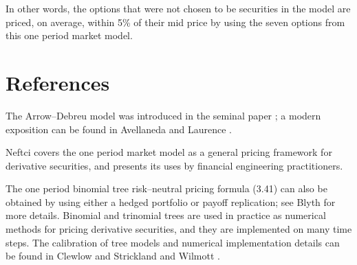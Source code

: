 In other words, the options that were not chosen to be securities in
the model are priced, on average, within 5\% of their mid price by
using the seven options from this one period market model.

\section{References}

The Arrow--Debreu model was introduced in the seminal paper
\cite{5}; a modern exposition can be found in Avellaneda and Laurence
\cite{7}.

Neftci \cite{31} covers the one period market model as a general
pricing framework for derivative securities, and presents its uses by
financial engineering practitioners.

The one period binomial tree risk--neutral pricing formula (3.41) can
also be obtained by using either a hedged portfolio or payoff
replication; see Blyth \cite{8} for more details. Binomial and trinomial
trees are used in practice as numerical methods for pricing derivative
securities, and they are implemented on many time steps. The
calibration of tree models and numerical implementation details can be
found in Clewlow and Strickland \cite{11} and Wilmott \cite{45}.
